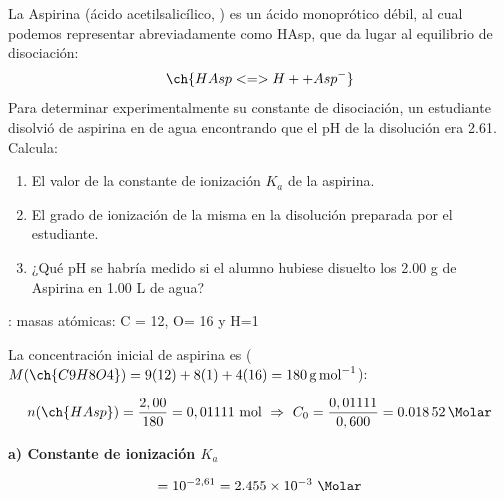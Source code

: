 \begin{exerciseEVAU}
    La Aspirina (ácido acetilsalicílico, ) es un ácido monoprótico débil, al cual podemos representar abreviadamente como HAsp, que da lugar al equilibrio de disociación:
    \begin{equation*}
        \ch{HAsp <=> H+ + Asp^{-}}
    \end{equation*}
    Para determinar experimentalmente su constante de disociación, un estudiante disolvió   de aspirina en   de agua encontrando que el pH de la disolución era \num{2.61}. Calcula:
    \begin{enumerate}[label=\letraminuscula]
        \item El valor de la constante de ionización \(K_a\)  de la aspirina.
        \item El grado de ionización de la misma en la disolución preparada por el estudiante.
        \item ¿Qué pH se habría medido si el alumno hubiese disuelto los 2.00 g de Aspirina en 1.00 L de agua?
    \end{enumerate}
    \datos{}: masas atómicas: C = 12, O= 16 y H=1



    \begin{solu}


        La concentración inicial de aspirina es (\(M(\ch{C9H8O4}) = 9(12)+8(1)+4(16) = \SI{180}{\gram\per\mole}\)):

        \begin{equation*}
            n(\ch{HAsp}) = \dfrac{2,00}{180} = 0,01111 \ \text{mol} \ \Rightarrow \ C_0 = \dfrac{0,01111}{0,600} = \SI{0.01852}{\Molar}
        \end{equation*}

        \textbf{a) Constante de ionización \(K_a\)}

        \begin{equation*}
            [\ch{H+}] = 10^{-2,61} = \num{2.455e-3} \ \si{\Molar}
        \end{equation*}


\end{solu}
\end{exerciseEVAU}
